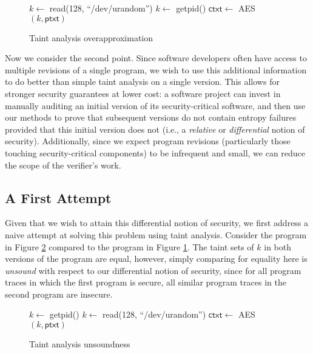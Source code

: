 \documentclass[letterpaper,twocolumn,10pt]{article}
\begin{document}
\begin{figure}
    \label{fig:prog1}
    \caption{Taint analysis overapproximation}
    \begin{center}
    \begin{algorithmic}
        
        \State $k \gets$ \textsf{read(128, ``/dev/urandom'')}
        \Else
        \State $k \gets$ \textsf{getpid()}
        \EndIf
        \State $\mathsf{ctxt} \gets $ \textsf{AES}$(k,\mathsf{ptxt})$
    \end{algorithmic}
\end{center}
\end{figure}

Now we consider the second point. Since software developers often have access to multiple revisions of a single program, we wish to use this additional information
to do better than simple taint analysis on a single version. This allows for stronger security guarantees at lower cost: a software project can invest
in manually auditing an initial version of its security-critical software, and then use our methods to prove that subsequent versions do not contain entropy
failures provided that this initial version does not (i.e., a \emph{relative} or \emph{differential} notion of security). Additionally, since we expect
program revisions (particularly those touching security-critical components) to be infrequent and small, we can reduce the scope of the verifier's work.

\subsection{A First Attempt}

Given that we wish to attain this differential notion of security, we first address a naive attempt at solving this problem using taint analysis.
Consider the program in Figure \ref{fig:prog2} compared to the program in Figure \ref{fig:prog1}. The taint sets of $k$ in both versions of the program
are equal, however, simply comparing for equality here is \emph{unsound} with respect to our differential notion of security, since for all program traces
in which the first program is secure, all similar program traces in the second program are insecure.

\begin{figure}
    \label{fig:prog2}
    \caption{Taint analysis unsoundness}
    \begin{center}
    \begin{algorithmic}
        \State $k \gets$ \textsf{getpid()}
        \Else
        \State $k \gets$ \textsf{read(128, ``/dev/urandom'')}
        \EndIf
        \State $\mathsf{ctxt} \gets $ \textsf{AES}$(k,\mathsf{ptxt})$
    \end{algorithmic}
\end{center}
\end{figure}
\end{document}
